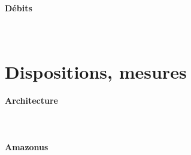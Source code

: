 \paragraph{Débits}
~\\
\cursive{
  \itshape
  \\
  \\
  \\
  \\

  \\
  \\
  \\
  \\

  \\
  \\
  \\

  \\
  \\
  \\
}

\section{Dispositions, mesures}
\paragraph{Architecture}
~\\
\cursive{
  \itshape
  \\
  \\
  \\
  \\

  \\
  \\
  \\
  \\

  \\
  \\
  \\

  \\
  \\
  \\
}
\paragraph{Amazonus}
~\\
\cursive{
  \itshape
  \\
  \\
  \\
  \\

  \\
  \\
  \\
  \\

  \\
  \\
  \\

  \\
  \\
  \\
}
